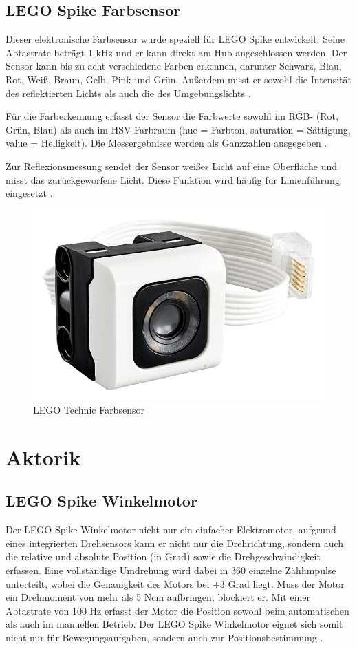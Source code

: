 \subsection{LEGO Spike Farbsensor}
Dieser elektronische Farbsensor wurde speziell für LEGO Spike entwickelt. Seine Abtastrate beträgt 1 kHz und er kann direkt am Hub angeschlossen werden. Der Sensor kann bis zu acht verschiedene Farben erkennen, darunter Schwarz, Blau, Rot, Weiß, Braun, Gelb, Pink und Grün. Außerdem misst er sowohl die Intensität des reflektierten Lichts als auch die des Umgebungslichts \autocite{lego2020colorsensor}\autocite{legoeducation2020spikesensors}.

Für die Farberkennung erfasst der Sensor die Farbwerte sowohl im RGB- (Rot, Grün, Blau) als auch im HSV-Farbraum (hue = Farbton, saturation = Sättigung, value = Helligkeit). Die Messergebnisse werden als Ganzzahlen ausgegeben \autocite{lego2020colorsensor}.

Zur Reflexionsmessung sendet der Sensor weißes Licht auf eine Oberfläche und misst das zurückgeworfene Licht. Diese Funktion wird häufig für Linienführung eingesetzt \autocite{betzold2025colorsensor}\autocite{lego2020colorsensor}.

\begin{figure}[H]
	\centering
	\includegraphics[width=0.4\linewidth]{images/Farbsensor}
	\caption[LEGO Technic Farbsensor Quelle:\autocite{legoeducation2020spikesensors}]{LEGO Technic Farbsensor}
	\label{fig:farbsensor}
\end{figure}





\section{Aktorik} %
\subsection{LEGO Spike Winkelmotor}
Der LEGO Spike Winkelmotor nicht nur ein einfacher Elektromotor, aufgrund eines integrierten Drehsensors kann er nicht nur die Drehrichtung, sondern auch die relative und absolute Position (in Grad) sowie die Drehgeschwindigkeit erfassen. Eine vollständige Umdrehung wird dabei in 360 einzelne Zählimpulse unterteilt, wobei die Genauigkeit des Motors bei $\pm3$ Grad liegt. Muss der Motor ein Drehmoment von mehr als 5 Ncm aufbringen, blockiert er. Mit einer Abtastrate von 100 Hz erfasst der Motor die Position sowohl beim automatischen als auch im manuellen Betrieb. Der LEGO Spike Winkelmotor eignet sich somit nicht nur für Bewegungsaufgaben, sondern auch zur Positionsbestimmung \autocite{legoeducation2020spikesensors}.

